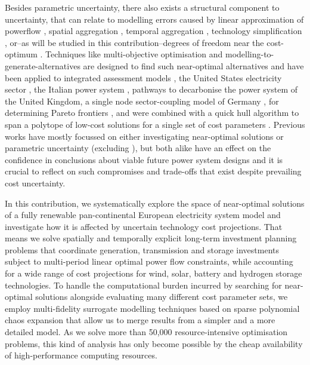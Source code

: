 Besides parametric uncertainty,
there also exists a structural component to uncertainty, that can
relate to modelling errors caused by
linear approximation of powerflow \cite{flowandlosses},
spatial aggregation \cite{hoersch_spatial_2017},
temporal aggregation \cite{kotzur_tsa_2018},
technology simplification \cite{DeCarolis2017},
or--as will be studied in this contribution--degrees
of freedom near the cost-optimum \cite{nearoptimal}.
Techniques like multi-objective optimisation and modelling-to-generate-alternatives
are designed to find such near-optimal alternatives and have been
applied to integrated assessment models \cite{Price2017}, 
the United States electricity sector \cite{DeCarolis2016},
the Italian power system \cite{lombardi_policy_2020},
pathways to decarbonise the power system of the United Kingdom\cite{Li2017},
a single node sector-coupling model of Germany \cite{nacken_integrated_2019},
for determining Pareto frontiers \cite{mavrotas_effective_2009},
and were combined with a quick hull algorithm to span a polytope of low-cost solutions
for a single set of cost parameters \cite{pedersen_modeling_2020}.
Previous works have mostly %
focussed on either investigating near-optimal solutions or parametric uncertainty
(excluding \cite{Li2017,lombardi_policy_2020}),
but both alike have an effect on the confidence in conclusions
about viable future power system designs and it is crucial
to reflect on such compromises and trade-offs that exist despite prevailing cost uncertainty.


In this contribution, we systematically explore the space of near-optimal solutions
of a fully renewable pan-continental European electricity system model
and investigate how it is affected by uncertain technology cost projections.
That means we solve spatially and temporally explicit long-term investment planning problems that
coordinate generation, transmission and storage investments
subject to multi-period linear optimal power flow constraints,
while accounting for a wide range of cost projections for wind, solar, battery and
hydrogen storage technologies.
To handle the computational burden incurred by searching for near-optimal solutions
alongside evaluating many different cost parameter sets,
we employ multi-fidelity surrogate modelling techniques based on sparse polynomial chaos expansion
that allow us to merge results from a simpler and a more detailed model.
As we solve more than 50,000 resource-intensive optimisation problems,
this kind of analysis has only become possible by the cheap availability 
of high-performance computing resources. 

